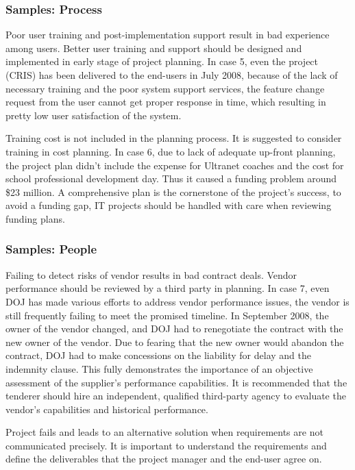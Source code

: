 \subsubsection{Samples: Process}
Poor user training and post-implementation support result in bad experience among users. Better user training and support should be designed and implemented in early stage of project planning. In case 5, even the project (CRIS) has been delivered to the end-users in July 2008, because of the lack of necessary training and the poor system support services, the feature change request from the user cannot get proper response in time, which resulting in pretty low user satisfaction of the system.

Training cost is not included in the planning process. It is suggested to consider training in cost planning. In case 6, due to lack of adequate up-front planning, the project plan didn't include the expense for Ultranet coaches and the cost for school professional development day. Thus it caused a funding problem around \$23 million. A comprehensive plan is the cornerstone of the project's success, to avoid a funding gap, IT projects should be handled with care when reviewing funding plans.

\subsubsection{Samples: People}
Failing to detect risks of vendor results in bad contract deals. Vendor performance should be reviewed by a third party in planning. In case 7, even DOJ has made various efforts to address vendor performance issues, the vendor is still frequently failing to meet the promised timeline. In September 2008, the owner of the vendor changed, and DOJ had to renegotiate the contract with the new owner of the vendor. Due to fearing that the new owner would abandon the contract, DOJ had to make concessions on the liability for delay and the indemnity clause. This fully demonstrates the importance of an objective assessment of the supplier's performance capabilities. It is recommended that the tenderer should hire an independent, qualified third-party agency to evaluate the vendor's capabilities and historical performance.


Project fails and leads to an alternative solution when requirements are not communicated precisely. It is important to understand the requirements and define the deliverables that the project manager and the end-user agree on.

